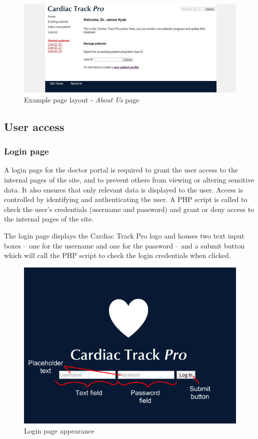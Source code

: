 \documentclass[11pt]{article}
\begin{document}
\begin{figure}[ht]
\begin{center}
\includegraphics[scale=0.5]{siteDesignGeneral}
\caption{Example page layout - \textit{About Us} page}
\label{fig:siteDesignGeneral}
\end{center}
\end{figure}

\subsection{User access}

\subsubsection{Login page}
A login page for the doctor portal is required to grant the user access to the internal pages of the site, and to prevent others from viewing or altering sensitive data. It also ensures that only relevant data is displayed to the user. Access is controlled by identifying and authenticating the user. A PHP script is called to check the user's credentials (username and password) and grant or deny access to the internal pages of the site.

The login page displays the Cardiac Track Pro logo and houses two text input boxes – one for the username and one for the password – and a submit button which will call the PHP script to check the login credentials when clicked.

\begin{figure}[ht]
\begin{center}
\includegraphics[scale=0.6]{login_design}
\end{center}
\caption{Login page appearance}
\label{fig:login_design}
\end{figure}
\end{document}
